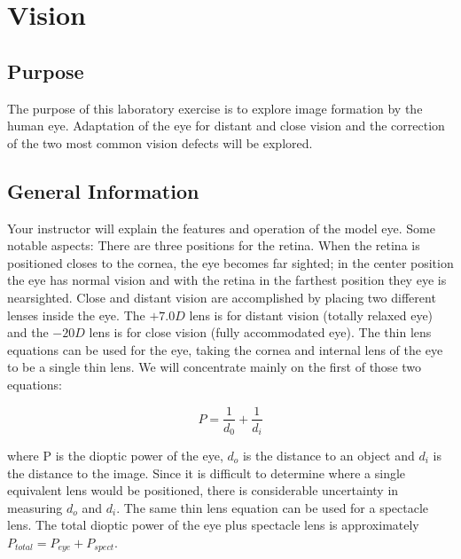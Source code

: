 \chapter{Vision}

\begin{multicols}{2}
\section{Purpose}
The purpose of this laboratory exercise is to explore image formation by the human eye. Adaptation of the eye for distant and close vision and the correction of the two most common vision defects will be explored.

\section{General Information}
Your instructor will explain the features and operation of the model eye. Some notable aspects: There are three positions for the retina. When the retina is positioned closes to the cornea, the eye becomes far sighted; in the center position the eye has normal vision and with the retina in the farthest position they eye is nearsighted. Close and distant vision are accomplished by placing two different lenses inside the eye. The $+7.0D$ lens is for distant vision (totally relaxed eye) and the $-20D$ lens is for close vision (fully accommodated eye).
The thin lens equations can be used for the eye, taking the cornea and internal lens of the eye to be a single thin lens. We will concentrate mainly on the first of those two equations:

\begin{equation}
	P = \frac{1}{d_0} + \frac{1}{d_i}
\end{equation}

\noindent where P is the dioptic power of the eye, $d_o$ is the distance to an object and $d_i$ is the distance to the image. Since it is difficult to determine where a single equivalent lens would be positioned, there is considerable uncertainty in measuring $d_o$ and $d_i$. The same thin lens equation can be used for a spectacle lens. The total dioptic power of the eye plus spectacle lens is approximately
	$P_{total} = P_{eye} + P_{spect}$.
	 

\end{multicols}

